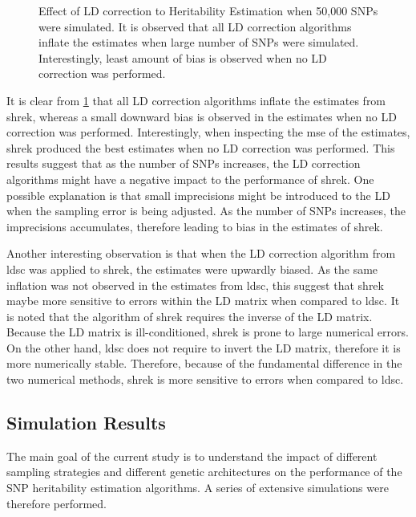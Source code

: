\begin{figure}[t]
{			\label{fig:bigvarLDCor}
		}
		\caption[Effect of LD correction to Heritability Estimation with 50,000 SNPs]
		{Effect of LD correction to Heritability Estimation when 50,000 \glspl{SNP} were simulated.
			It is observed that all \gls{LD} correction algorithms inflate the estimates when large number of \glspl{SNP} were simulated.
			Interestingly, least amount of bias is observed when no \gls{LD} correction was performed.
		} 
		\label{fig:ldCorBigCom}
	\end{figure}
	
	It is clear from \cref{fig:ldCorBigCom} that all \gls{LD} correction algorithms inflate the estimates from \gls{shrek}, whereas a small downward bias is observed in the estimates when no \gls{LD} correction was performed.
	Interestingly, when inspecting the \gls{mse} of the estimates, \gls{shrek} produced the best estimates when no \gls{LD} correction was performed.
	This results suggest that as the number of \glspl{SNP} increases, the \gls{LD} correction algorithms might have a negative impact to the performance of \gls{shrek}.
	One possible explanation is that small imprecisions might be introduced to the \gls{LD} when the sampling error is being adjusted.
	As the number of \glspl{SNP} increases, the imprecisions accumulates, therefore leading to bias in the estimates of \gls{shrek}.
	
	Another interesting observation is that when the \gls{LD} correction algorithm from \gls{ldsc} was applied to \gls{shrek}, the estimates were upwardly biased.
	As the same inflation was not observed in the estimates from \gls{ldsc}, this suggest that \gls{shrek} maybe more sensitive to errors within the \gls{LD} matrix when compared to \gls{ldsc}.
	It is noted that the algorithm of \gls{shrek} requires the inverse of the \gls{LD} matrix. 
	Because the \gls{LD} matrix is ill-conditioned, \gls{shrek} is prone to large numerical errors.
	On the other hand, \gls{ldsc} does not require to invert the \gls{LD} matrix, therefore it is more numerically stable.
	Therefore, because of the fundamental difference in the two numerical methods, \gls{shrek} is more sensitive to errors when compared to \gls{ldsc}.
	

	\subsection{Simulation Results}
	The main goal of the current study is to understand the impact of different sampling strategies and different genetic architectures on the performance of the \gls{SNP} heritability estimation algorithms.
	A series of extensive simulations were therefore performed.
	
